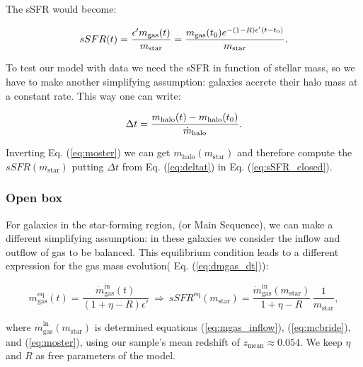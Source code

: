 \documentclass[fleqn,usenatbib]{mnras}
\begin{document}
The sSFR would become:

\begin{equation}
    sSFR(t) = \frac{\epsilon' m_\text{gas}(t)}{m_\text{{star}}} = \frac{m_\text{gas}(t_0)e^{-(1-R)\epsilon' (t-t_0)}}{m_\text{{star}}}.\\
    \label{eq:sSFR_closed}
\end{equation}

To test our model with data we need the sSFR in function of stellar mass, so we have to make another simplifying assumption: galaxies accrete their halo mass at a constant rate. This way one can write: 

\begin{equation}
   \Delta t = \frac{m_\text{halo}(t)- m_\text{halo}(t_0)}{\dot{m}_\text{halo}}. \\
   \label{eq:deltat}
\end{equation}

Inverting Eq. (\ref{eq:moster}) we can get $m_\text{halo}(m_\text{star})$ and therefore compute the $sSFR(m_\text{star})$ putting $\Delta t$ from Eq. (\ref{eq:deltat}) in  Eq. (\ref{eq:sSFR_closed}).


\subsubsection{\textbf{Open box}}
For galaxies in the star-forming region, (or Main Sequence), we can make a different simplifying assumption: in these galaxies we consider the inflow and outflow of gas to be balanced. This equilibrium condition leads to a different expression for the gas mass evolution( Eq.
(\ref{eq:dmgas_dt})):

{\fontsize{7.9pt}{7.9pt}\begin{equation}
    m^\text{eq}_\text{gas}(t) = \dfrac{\dot{m}_\text{gas}^\text{in}(t)}{(1+\eta-R)\epsilon'} \: \Rightarrow \: sSFR^\text{eq}\left(m_{\text{star}}\right) = \dfrac{\dot{m}_\text{gas}^\text{in}\left(m_{\text{star}}\right)}{1+\eta-R} \, \dfrac{1}{m_\text{star}},
	\label{eq:openbox_equilibrium}
\end{equation}}

where $\dot{m}_\text{gas}^\text{in}\left(m_{\text{star}}\right)$ is determined equations (\ref{eq:mgas_inflow}), (\ref{eq:mcbride}), and (\ref{eq:moster}), using our sample's mean redshift of $z_\text{mean} \approx 0.054$. We keep $\eta$ and $R$ as free parameters of the model. 
\end{document}

